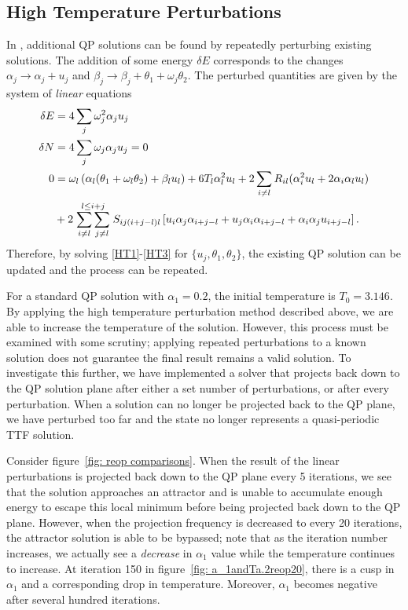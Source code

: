 \documentclass[../PhD.tex]{subfiles}
\begin{document}

\subsection{High Temperature Perturbations}
\label{ssec: highT}

In \cite{1507.08261}, additional QP solutions can be found by repeatedly perturbing existing solutions. The addition of some energy $\delta E$ corresponds to the changes $\alpha_j \to \alpha_j + u_j$ and $\beta_j \to \beta_j + \theta_1 + \omega_j \theta_2$. The perturbed quantities are given by the system of \emph{linear} equations
\begin{align}
\label{HT1}
\delta E &= 4 \sum_j \omega^2_j \alpha_j u_j \\
\label{HT2}
\delta N &= 4 \sum_j \omega_j \alpha_j u_j = 0 \\
\label{HT3}
0 &= \omega_l \left( \alpha_l (\theta_1 + \omega_l \theta_2) +\beta_l u_l \right) + 6T_l \alpha_l^2 u_l + 2 \sum_{i \neq l} R_{il} (\alpha_i^2 u_l + 2 \alpha_i \alpha_l u_l ) \nonumber \\
& + 2 \stackrel{l \leq i + j}{\sum_{i \neq l} \sum_{j \neq l}} S_{ij(i+j-l)l} \left[ u_i \alpha_j \alpha_{i+j-l} + u_j \alpha_i \alpha_{i+j-l} + \alpha_i \alpha_j u_{i+j-l} \right].
\end{align}
Therefore, by solving \eqref{HT1}-\eqref{HT3} for $\{ u_j, \theta_1, \theta_2 \}$, the existing QP solution can be updated and the process can be repeated. 

For a standard QP solution with $\alpha_1 = 0.2$, the initial temperature is $T_0 = 3.146$. By applying the high temperature perturbation method described above, we are able to increase the temperature of the solution. However, this process must be examined with some scrutiny; applying repeated perturbations to a known solution does not guarantee the final result remains a valid solution. To investigate this further, we have implemented a solver that projects back down to the QP solution plane after either a set number of perturbations, or after every perturbation. When a solution can no longer be projected back to the QP plane, we have perturbed too far and the state no longer represents a quasi-periodic TTF solution.

Consider figure~\ref{fig: reop comparisons}. When the result of the linear perturbations is projected back down to the QP plane every 5 iterations, we see that the solution approaches an attractor and is unable to accumulate enough energy to escape this local minimum before being projected back down to the QP plane. However, when the projection frequency is decreased to every 20 iterations, the attractor solution is able to be bypassed; note that as the iteration number increases, we actually see a \emph{decrease} in $\alpha_1$ value while the temperature continues to increase. At iteration 150 in figure~\ref{fig: a_1andTa.2reop20}, there is a cusp in $\alpha_1$ and a corresponding drop in temperature. Moreover, $\alpha_1$ becomes negative after several hundred iterations.
\end{document}
